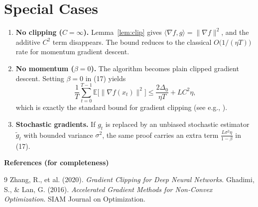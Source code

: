\documentclass{article}
\newcommand{\E}{\mathbb{E}}
\begin{document}
\section*{Special Cases}
\begin{enumerate}
    \item \textbf{No clipping ($C=\infty$).}  
          Lemma~\ref{lem:clip} gives $\langle\nabla f,g\rangle=\|\nabla f\|^{2}$,
          and the additive $C^{2}$ term disappears. The bound reduces to
          the classical $O\bigl(1/(\eta T)\bigr)$ rate for momentum gradient descent.
    \item \textbf{No momentum ($\beta=0$).}  
          The algorithm becomes plain clipped gradient descent.
          Setting $\beta=0$ in (17) yields
          \[
              \frac{1}{T}\sum_{t=0}^{T-1}\E\!\bigl[\|\nabla f(x_t)\|^{2}\bigr]
              \le
              \frac{2\Delta_{0}}{\eta T}+L C^{2}\eta,
          \]
          which is exactly the standard bound for gradient clipping
          (see e.g., \cite{zhang2020gradient}).
    \item \textbf{Stochastic gradients.}  
          If $g_t$ is replaced by an unbiased stochastic estimator
          $\tilde g_t$ with bounded variance $\sigma^{2}$, the same proof
          carries an extra term $\frac{L\sigma^{2}\eta}{1-\beta}$ in (17).
\end{enumerate}

\bigskip
\noindent\textbf{References (for completeness)}  
\begin{thebibliography}{9}
Zhang, R., et al. (2020). \emph{Gradient Clipping for Deep Neural Networks}.  
Ghadimi, S., \& Lan, G. (2016). \emph{Accelerated Gradient Methods for Non‑Convex
Optimization}. SIAM Journal on Optimization.
\end{thebibliography}
\end{document}
